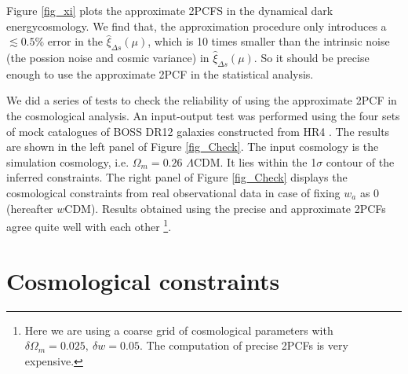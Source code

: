 \documentclass[iop]{emulateapj}
\begin{document}
Figure \ref{fig_xi} plots the approximate 2PCFS in the dynamical dark energycosmology.
We find that, the approximation procedure only introduces a $\lesssim0.5\%$ error in the $\hat\xi_{\Delta s}(\mu)$, 
which is 10 times smaller than the intrinsic noise (the possion noise and cosmic variance) in $\hat\xi_{\Delta s}(\mu)$.
So it should be precise enough to use the approximate 2PCF in the statistical analysis.

We did a series of tests to check the reliability of using the approximate 2PCF in the cosmological analysis.
An input-output test was performed using the four sets of mock catalogues of BOSS DR12 galaxies constructed from HR4 \citep{HR4}.
The results are shown in the left panel of Figure \ref{fig_Check}. 
The input cosmology is the simulation cosmology, i.e. $\Omega_m=0.26$ $\Lambda$CDM.
It lies within the 1$\sigma$ contour of the inferred constraints.
The right panel of Figure \ref{fig_Check} displays the cosmological constraints from real observational data
in case of fixing $w_a$ as 0 (hereafter $w$CDM).
Results obtained using the precise and approximate 2PCFs agree quite well with each other
\footnote{Here we are using a coarse grid of cosmological parameters with $\delta \Omega_m=0.025,\ \delta w=0.05$.
The computation of precise 2PCFs is very expensive.}.





\section{Cosmological constraints}
\end{document}
